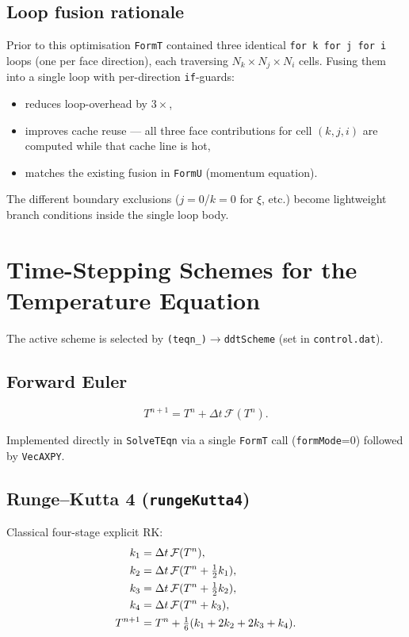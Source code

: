 \documentclass[12pt,a4paper]{article}
\begin{document}
\subsection*{Loop fusion rationale}

Prior to this optimisation \texttt{FormT} contained three identical
\texttt{for k for j for i} loops (one per face direction), each traversing
$N_k\times N_j\times N_i$ cells.  Fusing them into a single loop with
per-direction \texttt{if}-guards:
\begin{itemize}
  \item reduces loop-overhead by $3\times$,
  \item improves cache reuse — all three face contributions for cell $(k,j,i)$
        are computed while that cache line is hot,
  \item matches the existing fusion in \texttt{FormU} (momentum equation).
\end{itemize}
The different boundary exclusions ($j{=}0$/$k{=}0$ for $\xi$, etc.) become
lightweight branch conditions inside the single loop body.

\section{Time-Stepping Schemes for the Temperature Equation}
\label{sec:teqn-schemes}

The active scheme is selected by \texttt{(teqn\_)}$\to$\texttt{ddtScheme}
(set in \texttt{control.dat}).

\subsection{Forward Euler}
\label{ssec:teqn-fe}

\begin{equation}
  T^{n+1} = T^n + \Delta t\,\mathcal{F}(T^n).
\end{equation}

Implemented directly in \texttt{SolveTEqn} via a single \texttt{FormT} call
(\texttt{formMode}=0) followed by \texttt{VecAXPY}.

\subsection{Runge--Kutta 4 (\texttt{rungeKutta4})}
\label{ssec:teqn-rk4}

Classical four-stage explicit RK:
\begin{align}
  k_1 &= \Delta t\,\mathcal{F}(T^n), \notag\\
  k_2 &= \Delta t\,\mathcal{F}(T^n + \tfrac{1}{2}k_1), \notag\\
  k_3 &= \Delta t\,\mathcal{F}(T^n + \tfrac{1}{2}k_2), \notag\\
  k_4 &= \Delta t\,\mathcal{F}(T^n + k_3), \notag\\
  T^{n+1} &= T^n + \tfrac{1}{6}(k_1 + 2k_2 + 2k_3 + k_4). \notag
\end{align}
\end{document}
